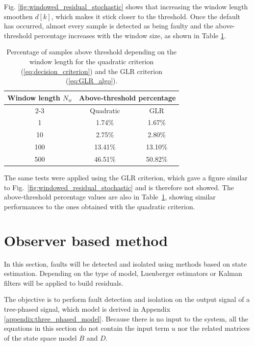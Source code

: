 \documentclass[conference]{IEEEtran}
\begin{document}
Fig. \ref{fig:windowed_residual_stochastic} shows that increasing the window length smoothen $d[k]$, which makes it stick closer to the threshold. Once the default has occurred, almost every sample is detected as being faulty and the above-threshold percentage increases with the window size, as shown in Table \ref{tab:window_above_threshold}.

\begin{table}[htbp]
    \centering
    \caption{Percentage of samples above threshold depending on the window length for the quadratic criterion (\ref{eq:decision_criterion}) and the GLR criterion (\ref{eq:GLR_algo}).}
    \label{tab:window_above_threshold}
    \begin{tabular}{ccc}
        \toprule
        \multirow{2}{*}{Window length $N_w$} & \multicolumn{2}{c}{Above-threshold percentage} \\
        \cmidrule(r){2-3}
                                            & Quadratic & GLR \\
        \midrule
        1   & 1.74\%  & 1.67\%  \\
        10  & 2.75\%  & 2.80\%  \\
        100 & 13.41\% & 13.10\% \\
        500 & 46.51\% & 50.82\% \\
        \bottomrule
    \end{tabular}
\end{table}

The same tests were applied using the GLR criterion, which gave a figure similar to Fig.~\ref{fig:windowed_residual_stochastic} and is therefore not showed. The above-threshold percentage values are also in Table~\ref{tab:window_above_threshold}, showing similar performances to the ones obtained with the quadratic criterion.

\section{Observer based method}

In this section, faults will be detected and isolated using methods based on state estimation. Depending on the type of model, Luenberger estimators or Kalman filters will be applied to build residuals.

The objective is to perform fault detection and isolation on the output signal of a tree-phased signal, which model is derived in Appendix \ref{appendix:three_phased_model}. Because there is no input to the system, all the equations in this section do not contain the input term $u$ nor the related matrices of the state space model $B$ and $D$.
\end{document}
